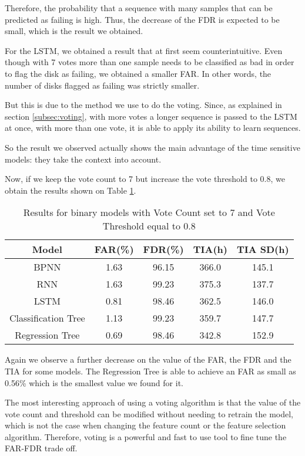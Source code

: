 Therefore, the probability that a sequence with many samples that can be predicted as failing is high.
Thus, the decrease of the FDR is expected to be small, which is the result we obtained.

For the LSTM, we obtained a result that at first seem counterintuitive.
Even though with 7 votes more than one sample needs to be classified as bad in order to flag the disk as failing, we obtained a smaller FAR.
In other words, the number of disks flagged as failing was strictly smaller.

But this is due to the method we use to do the voting.
Since, as explained in section \ref{subsec:voting}, with more votes a longer sequence is passed to the LSTM at once, with more than one vote, it is able to apply its ability to learn sequences.

So the result we observed actually shows the main advantage of the time sensitive models: they take the context into account.


Now, if we keep the vote count to 7 but increase the vote threshold to 0.8, we obtain the results shown on Table \ref{table:results_binary_threshold}.

\begin{table}
  \begin{center}
    \begin{tabular}{|c|c|c|c|c|}
      \hline
    Model & FAR(\%) & FDR(\%) & TIA(h) & TIA SD(h) \\
    \hline
    BPNN & 1.63 & 96.15 & 366.0 & 145.1 \\
    RNN & 1.63 & 99.23 & 375.3 & 137.7 \\
    LSTM & 0.81 & 98.46 & 362.5 & 146.0 \\
    Classification Tree & 1.13 & 99.23 & 359.7 & 147.7 \\
    Regression Tree & 0.69 & 98.46 & 342.8 & 152.9 \\
    \hline
    \end{tabular}
    \caption[Results Binary Models with Threshold]{Results for binary models with Vote Count set to 7 and Vote Threshold equal to 0.8}
    \label{table:results_binary_threshold}
  \end{center}
\end{table}

Again we observe a further decrease on the value of the FAR, the FDR and the TIA for some models.
The Regression Tree is able to achieve an FAR as small as 0.56\% which is the smallest value we found for it.

The most interesting approach of using a voting algorithm is that the value of the vote count and threshold can be modified without needing to retrain the model, which is not the case when changing the feature count or the feature selection algorithm.
Therefore, voting is a powerful and fast to use tool to fine tune the FAR-FDR trade off.

